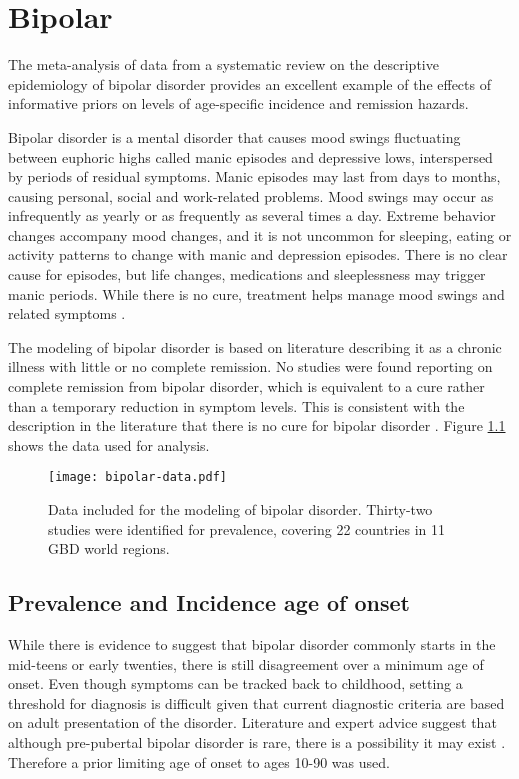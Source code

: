 \chapter{Bipolar}
\label{applications-prior_level_vals}

The meta-analysis of data from a systematic review on the descriptive epidemiology of bipolar disorder provides an excellent example of the effects of informative priors on levels of age-specific incidence and remission hazards.

Bipolar disorder is a mental disorder that causes mood swings fluctuating between euphoric highs called manic episodes and depressive lows, interspersed by periods of residual symptoms.  Manic episodes may last from days to months, causing personal, social and work-related problems.  Mood swings may occur as infrequently as yearly or as frequently as several times a day.  Extreme behavior changes accompany mood changes, and it is not uncommon for sleeping, eating or activity patterns to change with manic and depression episodes.  There is no clear cause for episodes, but life changes, medications and sleeplessness may trigger manic periods.  While there is no cure, treatment helps manage mood swings and related symptoms \cite{american_diagnostic_2000, national_bipolar_2012, national_bipolar_2011, angst_historical_2000}.

The modeling of bipolar disorder is based on literature describing it as a chronic illness with little or no complete remission.  No studies were found reporting on complete remission from bipolar disorder, which is equivalent to a cure rather than a temporary reduction in symptom levels.  This is consistent with the description in the literature that there is no cure for bipolar disorder \cite{american_diagnostic_2000}.  Figure \ref{fig:app-bipolar data} shows the data used for analysis.

    \begin{figure}[h]
        \begin{center}
            \texttt{[image: bipolar-data.pdf]}
            \caption{Data included for the modeling of bipolar disorder.  Thirty-two studies were identified for prevalence, covering 22 countries in 11 GBD world regions.}
            \label{fig:app-bipolar data}
        \end{center}
    \end{figure}

\section{Prevalence and Incidence age of onset}
While there is evidence to suggest that bipolar disorder commonly starts in the mid-teens or early twenties, there is still disagreement over a minimum age of onset. Even though symptoms can be tracked back to childhood, setting a threshold for diagnosis is difficult given that current diagnostic criteria are based on adult presentation of the disorder. Literature and expert advice suggest that although pre-pubertal bipolar disorder is rare, there is a possibility it may exist \cite{angst_historical_2000}. Therefore a prior limiting age of onset to ages 10-90 was used.


